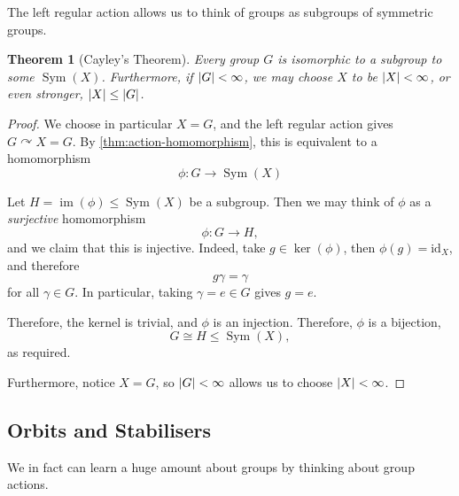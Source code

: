 \documentclass{article}
\newtheorem{theorem}{Theorem}[section]
\theoremstyle{definition}
\theoremstyle{remark}
\DeclarePairedDelimiter{\abs}{\lvert}{\rvert}
\newcommand{\pqty}[1]{\left(#1\right)}
\newcommand{\functiondomain}[3]{#1:#2\to #3}
\newcommand{\isomorphic}{\cong}
\newcommand{\subgroup}{\leq}
\newcommand{\actson}{\curvearrowright}
\newcommand{\identity}{\mathrm{id}}
\newcommand{\Sym}{\operatorname{Sym}}
\newcommand{\img}{\operatorname{im}}
\begin{document}
The left regular action allows us to think of groups as subgroups of symmetric groups.

\begin{theorem}[Cayley's Theorem]
    \label{thm:cayley}%
    Every group \(G\) is isomorphic to a subgroup to some \(\Sym\pqty{X}\). Furthermore, if \(\abs{G} < \infty\), we may choose \(X\) to be \(\abs{X} < \infty\), or even stronger, \(\abs{X} \leq \abs{G}\).
\end{theorem}

\begin{proof}
    We choose in particular \(X = G\), and the left regular action gives \(G \actson X = G\). By \autoref{thm:action-homomorphism}, this is equivalent to a homomorphism
    \[
        \functiondomain{\phi}{G}{\Sym\pqty{X}}
    \]

    Let \(H = \img \pqty{\phi} \subgroup \Sym\pqty{X}\) be a subgroup. Then we may think of \(\phi\) as a \emph{surjective} homomorphism
    \[
        \functiondomain{\phi}{G}{H},
    \]
    and we claim that this is injective. Indeed, take \(g \in \ker\pqty{\phi}\), then \(\phi\pqty{g} = \identity_{X}\), and therefore
    \[
        g \gamma = \gamma
    \]
    for all \(\gamma \in G\). In particular, taking \(\gamma = e \in G\) gives \(g = e\).

    Therefore, the kernel is trivial, and \(\phi\) is an injection. Therefore, \(\phi\) is a bijection,
    \[
        G \isomorphic H \subgroup \Sym\pqty{X},
    \]
    as required.

    Furthermore, notice \(X = G\), so \(\abs{G} < \infty\) allows us to choose \(\abs{X} < \infty\).
\end{proof}

\subsection{Orbits and Stabilisers}
\label{sec:orbits-and-stabilisers}

We in fact can learn a huge amount about groups by thinking about group actions.
\end{document}
